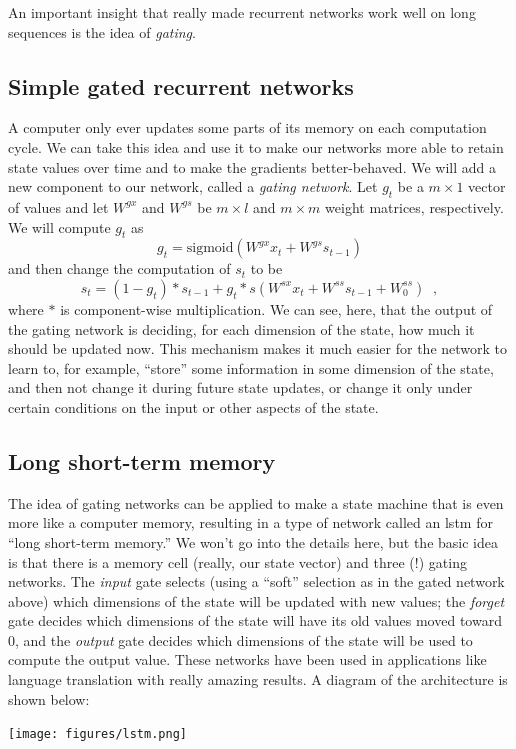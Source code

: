 An important insight that really made recurrent networks work well on
long sequences is the idea of {\em gating}.

\subsection{Simple gated recurrent networks}

A computer only ever updates some parts of its memory on each
computation cycle.  We can take this idea and use it to make our
networks more able to retain state values over time and to make the
gradients better-behaved.  We will add a new component to our network,
called a {\em gating network}.  Let $g_t$ be a $m \times 1$ vector of
values and let $W^{gx}$ and $W^{gs}$ be $m \times l$ and $m \times m$
weight matrices, respectively.  We will compute $g_t$ as
\begin{equation}
g_t = \text{sigmoid}(W^{gx} x_t + W^{gs} s_{t-1})
\end{equation}
and then change the computation of $s_t$ to be
\begin{equation}
s_t = (1 - g_t) *  s_{t-1} + g_t * s(W^{sx}x_t + W^{ss}
  s_{t-1} + W^{ss}_0)\;\;,
\end{equation}
where $*$ is component-wise multiplication.  We can see, here, that
the output of the gating network is deciding, for each dimension of
the state, how much it should be updated now.  This mechanism makes it
much easier for the network to learn to,  for example, ``store'' some
information in some dimension of the state, and then not change it
during future state updates, or change it only under certain
conditions on the input or other aspects of the state.

\subsection{Long short-term memory}

The idea of gating networks can be applied to make a state machine
that is even more like a computer memory, resulting in a type of
network called an {\sc  lstm} for ``long short-term memory.''
  We won't go
into the details here,  but the basic idea is that there is a memory
cell (really, our state vector) and three (!) gating networks.  The
{\em input} gate selects (using a ``soft''  selection as in the gated
network above) which dimensions of the state will be updated  with new
values;  the {\em forget} gate decides which dimensions of the state
will have its old values  moved toward 0, and the {\em  output} gate
decides which dimensions of the state will be used to compute the
output value.  These networks have been used in applications like
language translation with really amazing results.  A diagram of the 
architecture is shown below:
\begin{center}
\texttt{[image: figures/lstm.png]}
\end{center}

\fi


